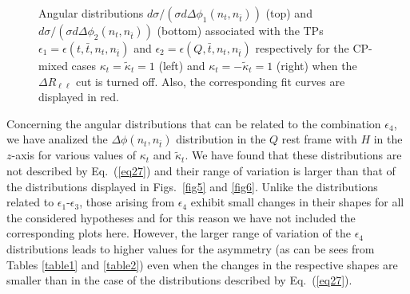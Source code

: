 \documentclass[aps,preprint,tightenlines,floatfix,superscriptaddress,nofootinbib,showpacs]{revtex4-1}
\def\tbar{\bar{t}}
\def\kp{\kappa_t}
\def\kpt{\tilde{\kappa}_t}
\def\TPa{\epsilon(t,\tbar,n_t,n_{\tbar})}
\def\TPb{\epsilon(Q,\tbar,n_t,n_{\tbar})}
\begin{document}
\begin{center}
\begin{figure}[H]
\hspace*{-0.006\textwidth}
\caption{Angular distributions $d\sigma/(\sigma
  d\Delta\phi_1(n_t,n_{\tbar}))$ (top) and $d\sigma/(\sigma
  d\Delta\phi_2(n_t,n_{\tbar}))$ (bottom) associated with the TPs
  $\epsilon_1=\TPa$ and $\epsilon_2=\TPb$ respectively for the
  $\mathrm{CP}$-mixed cases $\kp=\kpt=1$ (left) and $\kp=-\kpt=1$
  (right) when the $\Delta R_{\ell\ell}$ cut is turned off. Also, the
  corresponding fit curves are displayed in red.}
\label{fig7}
\end{figure}
\end{center}
\par Concerning the angular distributions that can be related to the
combination $\epsilon_4$, we have analized the
$\Delta\phi(n_t,n_{\tbar})$ distribution in the $Q$ rest frame with
$H$ in the $z$-axis for various values of $\kp$ and $\kpt$. We have
found that these distributions are not described by Eq.~(\ref{eq27})
and their range of variation is larger than that of the distributions
displayed in Figs.~\ref{fig5} and \ref{fig6}. Unlike the distributions
related to $\epsilon_1$-$\epsilon_3$, those arising from $\epsilon_4$
exhibit small changes in their shapes for all the considered
hypotheses and for this reason we have not included the corresponding
plots here. However, the larger range of variation of the $\epsilon_4$
distributions leads to higher values for the asymmetry (as can be sees
from Tables \ref{table1} and \ref{table2}) even when the changes in
the respective shapes are smaller than in the case of the
distributions described by Eq.~(\ref{eq27}).  \par
\end{document}
